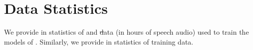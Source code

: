 \section{Data Statistics}








We provide in  statistics of \asr and \st data (in hours of speech audio) used to train the \xt models of \mfourt. Similarly, we provide in  statistics of \sst training data.





